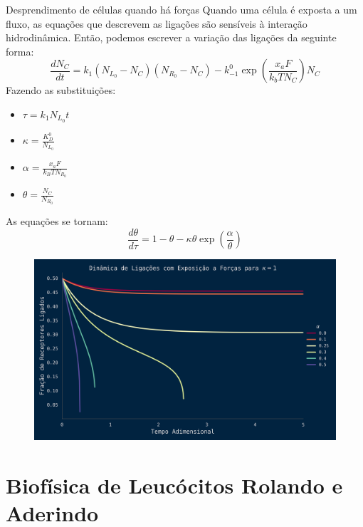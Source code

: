\documentclass[aspectratio=169]{beamer}
\begin{document}
\begin{frame}{Desprendimento de células quando há forças}
    Quando uma célula é exposta a um fluxo, as equações que descrevem as ligações são sensíveis à interação hidrodinâmica.
    Então, podemos escrever a variação das ligações da seguinte forma:
    \begin{equation}
        \frac{d N_C}{dt} = k_{1}(N_{L_0} - N_C)(N_{R_0} - N_C) - k_{-1}^{0} \exp \left(\frac{x_a F}{k_b T N_C} \right) N_C
    \end{equation}
    Fazendo as substituições:
    \begin{itemize}
        \item $\tau = k_1 N_{L_0} t$
        \item $\kappa = \frac{K^{0}_{D}}{N_{L_0}}$
        \item $\alpha = \frac{x_a F}{k_B T N_{R_0}}$
        \item $\theta = \frac{N_C}{N_{R_0}}$
    \end{itemize}

\end{frame}

\begin{frame}
    As equações se tornam:
    \begin{equation}
        \frac{d \theta}{d \tau} = 1 - \theta - \kappa \theta \exp \left(\frac{\alpha}{\theta}\right)
    \end{equation}

    \begin{figure}
        \includegraphics[width=0.6 \textwidth]{img/dettach_force.png}
    \end{figure}

\end{frame}

\section{Biofísica de Leucócitos Rolando e Aderindo}
\end{document}
